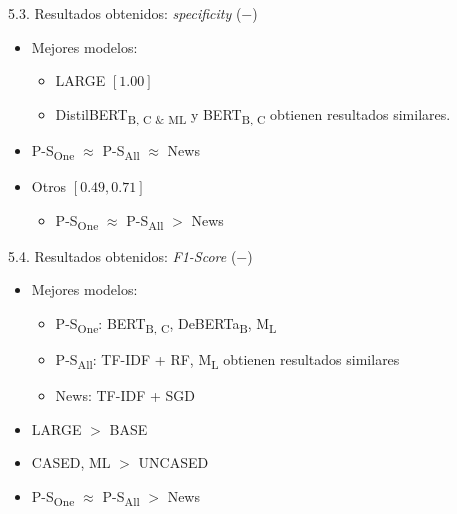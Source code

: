 \begin{frame}{5.3. Resultados obtenidos: \textit{specificity} ($-$)}
    \begin{itemize}
        \item Mejores modelos:
        \begin{itemize}
            \item LARGE $[1.00]$
            \item {DistilBERT}\textsubscript{B, C \& ML} y {BERT}\textsubscript{B, C} obtienen resultados similares.
        \end{itemize}
        \item {P-S}\textsubscript{One} $\approx$ {P-S}\textsubscript{All} $\approx$ News
        \item Otros $[0.49, 0.71]$
        \begin{itemize}
            \item {P-S}\textsubscript{One} $\approx$ {P-S}\textsubscript{All} $>$ News
        \end{itemize}
    \end{itemize}
\end{frame}

\begin{frame}{5.4. Resultados obtenidos: \textit{F1-Score} ($-$)}
    \begin{itemize}
        \item Mejores modelos:
        \begin{itemize}
            \item {P-S}\textsubscript{One}: {BERT}\textsubscript{B, C}, {DeBERTa}\textsubscript{B}, {M}\textsubscript{L}
            \item {P-S}\textsubscript{All}: TF-IDF + RF, {M}\textsubscript{L} obtienen resultados similares
            \item News: TF-IDF + SGD
        \end{itemize}
        \item LARGE $>$ BASE
        \item CASED, ML $>$ UNCASED
        \item {P-S}\textsubscript{One} $\approx$ {P-S}\textsubscript{All} $>$ News
    \end{itemize}
\end{frame}

